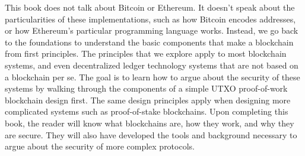 This book does not talk about Bitcoin or Ethereum. It doesn't speak
about the particularities of these implementations, such as how Bitcoin
encodes addresses, or how Ethereum's particular programming language works.
Instead, we go back to the foundations to understand the basic components
that make a blockchain from first principles. The principles that we explore
apply to most blockchain systems, and even decentralized ledger technology
systems that are not based on a blockchain per se. The goal is to learn
how to argue about the security of these systems by walking through the
components of a simple UTXO proof-of-work blockchain design first. The
same design principles apply when designing more complicated systems such
as proof-of-stake blockchains. Upon completing this book, the reader will
know what blockchains are, how they work, and why they are secure. They
will also have developed the tools and background necessary to argue about
the security of more complex protocols.
